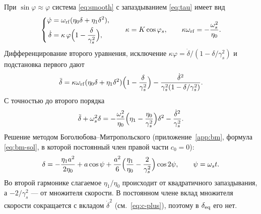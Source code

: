 При $\sin\varphi\approx\varphi$ система \eqref{eq:smooth} с запаздыванием \eqref{eq:tau} имеет вид
\begin{equation}
\label{eq:system}
\left\{
\begin{aligned}
\dot\varphi&=\omega_{\mathrm{rf}}(\eta_0\delta+\eta_1\delta^2),\\
\dot\delta&=\kappa\,\varphi\Bigl(1-\frac{\delta}{\gamma_s^2}\Bigr),
\end{aligned}
\right.
\qquad
\kappa=K\cos\varphi_s,
\qquad
\kappa\omega_{\mathrm{rf}}=-\frac{\omega_s^2}{\eta_0}.
\end{equation}
Дифференцирование второго уравнения, исключение $\kappa\varphi=\dot\delta/(1-\delta/\gamma_s^2)$ и подстановка первого дают
\begin{equation}
\label{eq:ddelta-raw}
\ddot\delta
=\kappa\omega_{\mathrm{rf}}(\eta_0\delta+\eta_1\delta^2)\Bigl(1-\frac{\delta}{\gamma_s^2}\Bigr)
-\frac{\dot\delta^2}{\gamma_s^2(1-\delta/\gamma_s^2)}.
\end{equation}
С точностью до второго порядка
\begin{equation}
\label{eq:ode}
\ddot\delta+\omega_s^2\delta
=-\frac{\omega_s^2}{\eta_0}\Bigl(\eta_1-\frac{\eta_0}{\gamma_s^2}\Bigr)\delta^2
-\frac{\dot\delta^2}{\gamma_s^2}.
\end{equation}
Решение методом Боголюбова--Митропольского (приложение~\ref{app:bm}, формула \eqref{eq:bm-sol}, в которой постоянный член правой части $c_0=0$):
\begin{equation}
\label{eq:delta-a}
\delta
=-\frac{\eta_1 a^2}{2\eta_0}
+a\cos\psi
+\frac{a^2}{6}\Bigl(\frac{\eta_1}{\eta_0}-\frac{2}{\gamma_s^2}\Bigr)\cos 2\psi,
\qquad
\psi=\omega_s t.
\end{equation}
Во второй гармонике слагаемое $\eta_1/\eta_0$ происходит от квадратичного запаздывания, а $-2/\gamma_s^2$ --- от множителя скорости. В постоянном члене вклад множителя скорости сокращается с вкладом $\dot\delta^2$ (см.~\eqref{eq:c-plus}), поэтому в $\delta_{\mathrm{eq}}$ его нет.

